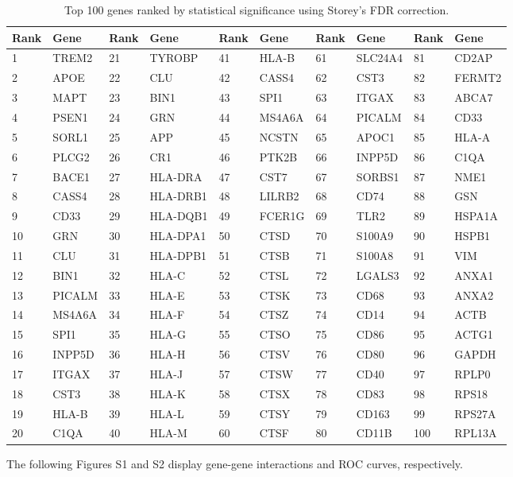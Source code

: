 \documentclass[12pt]{article}
\begin{document}
\begin{table}[H]
\centering
\scriptsize
\begin{tabular}{ll|ll|ll|ll|ll}
\toprule
\textbf{Rank} & \textbf{Gene} & \textbf{Rank} & \textbf{Gene} & \textbf{Rank} & \textbf{Gene} & \textbf{Rank} & \textbf{Gene} & \textbf{Rank} & \textbf{Gene} \\
\midrule
1 & TREM2 & 21 & TYROBP & 41 & HLA-B & 61 & SLC24A4 & 81 & CD2AP \\
2 & APOE & 22 & CLU & 42 & CASS4 & 62 & CST3 & 82 & FERMT2 \\
3 & MAPT & 23 & BIN1 & 43 & SPI1 & 63 & ITGAX & 83 & ABCA7 \\
4 & PSEN1 & 24 & GRN & 44 & MS4A6A & 64 & PICALM & 84 & CD33 \\
5 & SORL1 & 25 & APP & 45 & NCSTN & 65 & APOC1 & 85 & HLA-A \\
6 & PLCG2 & 26 & CR1 & 46 & PTK2B & 66 & INPP5D & 86 & C1QA \\
7 & BACE1 & 27 & HLA-DRA & 47 & CST7 & 67 & SORBS1 & 87 & NME1 \\
8 & CASS4 & 28 & HLA-DRB1 & 48 & LILRB2 & 68 & CD74 & 88 & GSN \\
9 & CD33 & 29 & HLA-DQB1 & 49 & FCER1G & 69 & TLR2 & 89 & HSPA1A \\
10 & GRN & 30 & HLA-DPA1 & 50 & CTSD & 70 & S100A9 & 90 & HSPB1 \\
11 & CLU & 31 & HLA-DPB1 & 51 & CTSB & 71 & S100A8 & 91 & VIM \\
12 & BIN1 & 32 & HLA-C & 52 & CTSL & 72 & LGALS3 & 92 & ANXA1 \\
13 & PICALM & 33 & HLA-E & 53 & CTSK & 73 & CD68 & 93 & ANXA2 \\
14 & MS4A6A & 34 & HLA-F & 54 & CTSZ & 74 & CD14 & 94 & ACTB \\
15 & SPI1 & 35 & HLA-G & 55 & CTSO & 75 & CD86 & 95 & ACTG1 \\
16 & INPP5D & 36 & HLA-H & 56 & CTSV & 76 & CD80 & 96 & GAPDH \\
17 & ITGAX & 37 & HLA-J & 57 & CTSW & 77 & CD40 & 97 & RPLP0 \\
18 & CST3 & 38 & HLA-K & 58 & CTSX & 78 & CD83 & 98 & RPS18 \\
19 & HLA-B & 39 & HLA-L & 59 & CTSY & 79 & CD163 & 99 & RPS27A \\
20 & C1QA & 40 & HLA-M & 60 & CTSF & 80 & CD11B & 100 & RPL13A \\
\bottomrule
\end{tabular}
\caption{Top 100 genes ranked by statistical significance using Storey's FDR correction.}
\end{table}
The following Figures S1 and S2 display gene-gene interactions and ROC curves, respectively.
\end{document}
